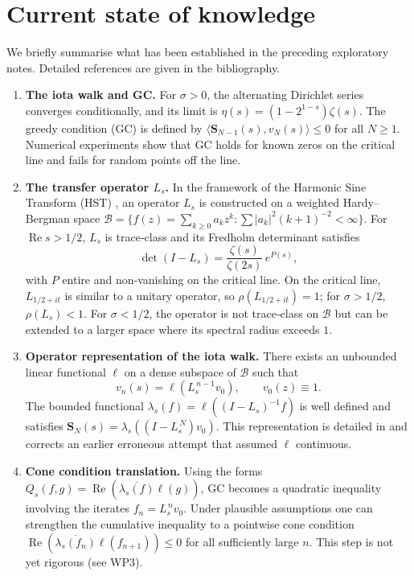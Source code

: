 \documentclass[11pt,a4paper]{article}
\newcommand{\RE}{\operatorname{Re}}
\begin{document}
\section{Current state of knowledge}
We briefly summarise what has been established in the preceding exploratory notes.  Detailed references are given in the bibliography.

\begin{enumerate}[label=(\arabic*)]
\item \textbf{The iota walk and GC.}  For $\sigma > 0$, the alternating Dirichlet series converges conditionally, and its limit is $\eta(s) = (1-2^{1-s})\zeta(s)$.  The greedy condition (GC) is defined by $\langle \mathbf{S}_{N-1}(s), v_N(s)\rangle \le 0$ for all $N \ge 1$.  Numerical experiments show that GC holds for known zeros on the critical line and fails for random points off the line.

\item \textbf{The transfer operator $L_s$.}  In the framework of the Harmonic Sine Transform (HST) \cite{HST}, an operator $L_s$ is constructed on a weighted Hardy–Bergman space $\mathcal{B} = \{ f(z) = \sum_{k\ge 0} a_k z^k : \sum |a_k|^2 (k+1)^{-2} < \infty \}$.  For $\RE s > 1/2$, $L_s$ is trace‑class and its Fredholm determinant satisfies  
\[
\det(I - L_s) = \frac{\zeta(s)}{\zeta(2s)}\, e^{P(s)},
\]
with $P$ entire and non‑vanishing on the critical line.  On the critical line, $L_{1/2+it}$ is similar to a unitary operator, so $\rho(L_{1/2+it}) = 1$; for $\sigma > 1/2$, $\rho(L_s) < 1$.  For $\sigma < 1/2$, the operator is not trace‑class on $\mathcal{B}$ but can be extended to a larger space where its spectral radius exceeds $1$.

\item \textbf{Operator representation of the iota walk.}  There exists an unbounded linear functional $\ell$ on a dense subspace of $\mathcal{B}$ such that  
\[
v_n(s) = \ell( L_s^{\,n-1} v_0 ), \qquad v_0(z) \equiv 1.
\]
The bounded functional $\lambda_s(f) = \ell( (I - L_s)^{-1} f )$ is well defined and satisfies $\mathbf{S}_N(s) = \lambda_s( (I - L_s^{\,N}) v_0 )$.  This representation is detailed in \cite{Task1b} and corrects an earlier erroneous attempt that assumed $\ell$ continuous.

\item \textbf{Cone condition translation.}  Using the forms $Q_s(f,g) = \RE( \overline{\lambda_s(f)} \ell(g) )$, GC becomes a quadratic inequality involving the iterates $f_n = L_s^{\,n} v_0$.  Under plausible assumptions one can strengthen the cumulative inequality to a pointwise cone condition $\RE( \overline{\lambda_s(f_n)} \ell( f_{n+1} ) ) \le 0$ for all sufficiently large $n$.  This step is not yet rigorous (see WP3).


\end{enumerate}
\end{document}
